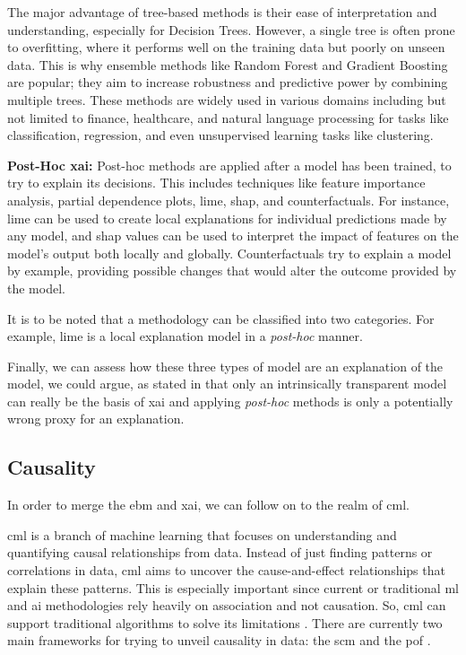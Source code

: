 The major advantage of tree-based methods is their ease of interpretation and understanding, especially for Decision Trees. However, a single tree is often prone to overfitting, where it performs well on the training data but poorly on unseen data. This is why ensemble methods like Random Forest and Gradient Boosting are popular; they aim to increase robustness and predictive power by combining multiple trees. These methods are widely used in various domains including but not limited to finance, healthcare, and natural language processing for tasks like classification, regression, and even unsupervised learning tasks like clustering.

\textbf{Post-Hoc \ac{xai}:} Post-hoc methods are applied after a model has been trained, to try to explain its decisions. This includes techniques like feature importance analysis, partial dependence plots, \ac{lime}, \ac{shap}, and counterfactuals. For instance, \ac{lime} can be used to create local explanations for individual predictions made by any model, and \ac{shap} values can be used to interpret the impact of features on the model's output both locally and globally. Counterfactuals try to explain a model by example, providing possible changes that would alter the outcome provided by the model.

It is to be noted that a methodology can be classified into two categories. For example, \ac{lime} is a local explanation model in a \textit{post-hoc} manner.

Finally, we can assess how these three types of model are an explanation of the model, we could argue, as stated in \cite{rudinStopExplainingBlack2019} that only an intrinsically transparent model can really be the basis of \ac{xai} and applying \textit{post-hoc} methods is only a potentially wrong proxy for an explanation.

\subsection{Causality}\label{causalml}

In order to merge the \ac{ebm} and \ac{xai}, we can follow on to the realm of \ac{cml}.


\ac{cml} is a branch of machine learning that focuses on understanding and quantifying causal relationships from data. Instead of just finding patterns or correlations in data, \ac{cml} aims to uncover the cause-and-effect relationships that explain these patterns.
This is especially important since current or traditional \ac{ml} and \ac{ai} methodologies rely heavily on association and not causation. So, \ac{cml} can support traditional algorithms to solve its limitations \cite{pearlTheoreticalImpedimentsMachine2018}.
There are currently two main frameworks for trying to unveil causality in data: the \ac{scm}  and the \ac{pof} \cite{shiLearningCausalEffects2022b}.

